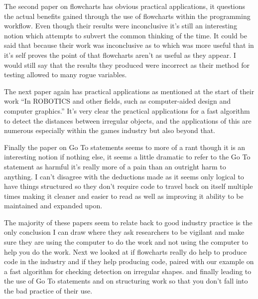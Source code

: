 \documentclass{scrartcl}
\begin{document}
The second paper on flowcharts has obvious practical applications, it questions the actual benefits gained through the use of flowcharts within the programming workflow. Even though their results were inconclusive it's still an interesting notion which attempts to subvert the common thinking of the time. It could be said that because their work was inconclusive as to which was more useful that in it's self proves the point of that flowcharts aren't as useful as they appear. I would still say that the results they produced were incorrect as their method for testing allowed to many rogue variables.

The next paper again has practical applications as mentioned at the start of their work ``In  ROBOTICS and other fields, such as computer-aided  design and computer graphics.'' It's very clear the practical applications for a fast algorithm to detect the distances between irregular objects, and the applications of this are numerous especially within the games industry but also beyond that. 

Finally the paper on Go To statements seems to more of a rant though it is an interesting notion if nothing else, it seems a little dramatic to refer to the Go To statement as harmful it's really more of a pain than an outright harm to anything. I can't disagree with the deductions made as it seems only logical to have things structured so they don't require code to travel back on itself multiple times making it cleaner and easier to read as well as improving it ability to be maintained and expanded upon.

The majority of these papers seem to relate back to good industry practice is the only conclusion I can draw where they ask researchers to be vigilant and make sure they are using the computer to do the work and not using the computer to help you do the work. Next we looked at if flowcharts really do help to produce code in the industry and if they help producing code, paired with our example on a fast algorithm for checking detection on irregular shapes. and finally leading to the use of Go To statements and on structuring work so that you don't fall into the bad practice of their use.




\end{document}
